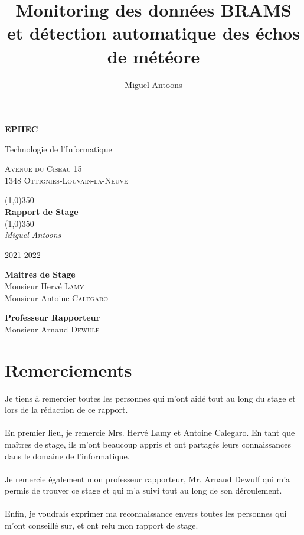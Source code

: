 \documentclass[11pt]{article}
\title{Monitoring des données BRAMS et détection automatique des échos de météore}
\author{Miguel Antoons}
\begin{document}
\begin{titlepage}
    \begin{center}
        \LARGE
        \textbf{EPHEC}

        \vspace{0.1cm}
        \LARGE
        Technologie de l'Informatique

        \large
        \vspace{1.5cm}
        \textsc{Avenue du Ciseau 15}\\
        \textsc{1348 Ottignies-Louvain-la-Neuve}


        \line(1,0){350}\\
        \Huge
        \textbf{Rapport de Stage}\\
        \line(1,0){350}\\

        \vspace{0.5cm}
        \Large
        \textit{Miguel Antoons}

        \vspace{0.5cm}
        \large
        2021-2022

        \vspace{2.5cm}
        \large
        \textbf{Maitres de Stage}
        \vspace{0.2cm}\\
        Monsieur Hervé \textsc{Lamy}\\
        Monsieur Antoine \textsc{Calegaro}

        \vspace{2.5cm}
        \large
        \textbf{Professeur Rapporteur}
        \vspace{0.2cm}\\
        Monsieur Arnaud \textsc{Dewulf}


    \end{center}
\end{titlepage}

\tableofcontents

\newpage

\section{Remerciements}
Je tiens à remercier toutes les personnes qui m'ont aidé tout au long du stage et lors de la rédaction de ce rapport.\\
\\
En premier lieu, je remercie Mrs. Hervé Lamy et Antoine Calegaro. En tant que maîtres de stage, ils m'ont beaucoup appris et ont partagés leurs connaissances dans le domaine de l'informatique.\\
\\
Je remercie également mon professeur rapporteur, Mr. Arnaud Dewulf qui m'a permis de trouver ce stage et qui m'a suivi tout au long de son déroulement.\\
\\
Enfin, je voudrais exprimer ma reconnaissance envers toutes les personnes qui m'ont conseillé sur, et ont relu mon rapport de stage.
\end{document}
